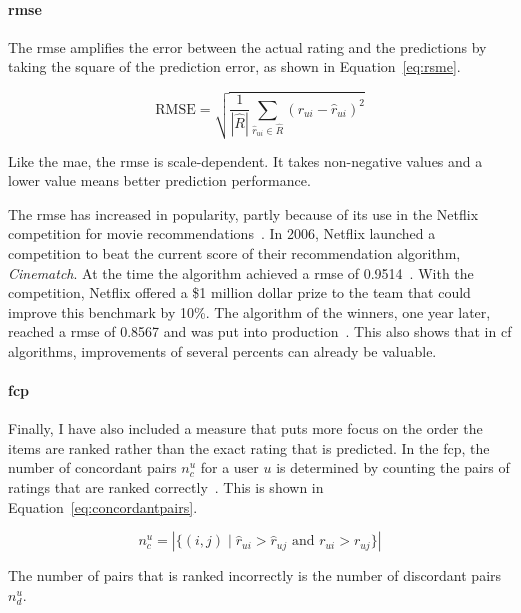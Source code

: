 \paragraph{\gls{rmse}}
The \gls{rmse} amplifies the error between the actual rating and the predictions by taking the square of the prediction error, as shown in Equation~\ref{eq:rsme}.

\begin{equation}
    \label{eq:rsme}
    \text{RMSE} = \sqrt{ \frac{1}{ |\hat{R}| }  \sum\limits_{\hat{r}_{ui} \in \hat{R}} (r_{ui} - \hat{r}_{ui})^2}
\end{equation}

Like the \gls{mae}, the \gls{rmse} is scale-dependent.
It takes non-negative values and a lower value means better prediction performance.

The \gls{rmse} has increased in popularity, partly because of its use in the Netflix competition for movie recommendations~\cite{su2009survey,zhou2008large}.
In 2006, Netflix launched a competition to beat the current score of their recommendation algorithm, \emph{Cinematch}.
At the time the algorithm achieved a \gls{rmse} of 0.9514~\cite{zhou2008large,bennett2007netflix}.
With the competition, Netflix offered a \$1 million dollar prize to the team that could improve this benchmark by 10\%.
The algorithm of the winners, one year later, reached a \gls{rmse} of 0.8567 and was put into production~\cite{zhou2008large,netflixprizeforum,netflixprizeleaderboard}.
This also shows that in \gls{cf} algorithms, improvements of several percents can already be valuable.

\paragraph{\gls{fcp}}
Finally, I have also included a measure that puts more focus on the order the items are ranked rather than the exact rating that is predicted.
In the \gls{fcp}, the number of concordant pairs $n_{c}^{u}$ for a user $u$ is determined by counting the pairs of ratings that are ranked correctly~\cite{koren2013collaborative}.
This is shown in Equation~\ref{eq:concordantpairs}.

\begin{equation}
    \label{eq:concordantpairs}
    n_{c}^{u} = |\{(i,j) \mid \hat{r}_{ui} > \hat{r}_{uj} \text{ and } r_{ui} > r_{uj} \}|
\end{equation}

The number of pairs that is ranked incorrectly is the number of discordant pairs $n_{d}^u$.

